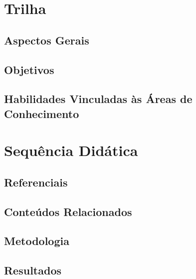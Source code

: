 \documentclass[aspectratio=169]{beamer}
\begin{document}
\usetikzlibrary{positioning}
\usetikzlibrary{shadows.blur, trees}



\newcommand{\autor}{Rodrigo Ribamar Silva do Nascimento}
\newcommand{\github}{github.com/physikices}
\newcommand{\email}{rodrigo.nascimento@edu.udesc.br}
\newcommand{\website}{}
\capa



\section{Trilha}
\subsection{Aspectos Gerais}
\subsection{Objetivos}
\subsection{Habilidades Vinculadas às Áreas de Conhecimento}

\section{Sequência Didática}
\subsection{Referenciais}
\subsection{Conteúdos Relacionados}
\subsection{Metodologia}
\subsection{Resultados}
\end{document}
